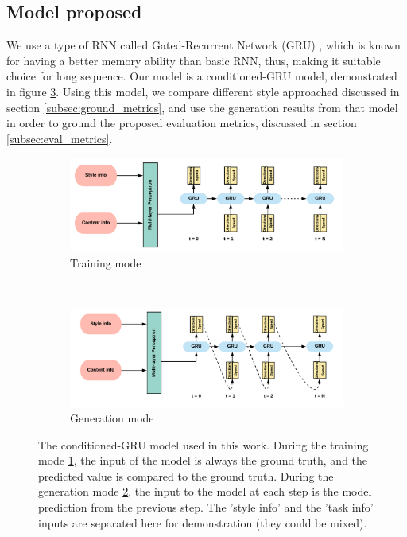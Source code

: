 \subsection{Model proposed}
We use a type of RNN called Gated-Recurrent Network (GRU) \citep{chung2014empirical}, which is known for having a better memory ability than basic RNN, thus, making it suitable choice for long sequence. Our model is a conditioned-GRU model, demonstrated in figure \ref{fig:dtl_model}. Using this model, we compare different style approached discussed in section \ref{subsec:ground_metrics}, and use the generation results from that model in order to ground the proposed evaluation metrics, discussed in section \ref{subsec:eval_metrics}.
\begin{figure}[!htbp]
    \centering
    \begin{subfigure}[b]{\textwidth}
        \includegraphics[width=\textwidth]{images/gbem/dtl_training.png}
        \caption{Training mode}
        \label{subfig:dtl_training}
    \end{subfigure}
    ~
    \begin{subfigure}[b]{\textwidth}
        \includegraphics[width=\textwidth]{images/gbem/dtl_generation.png}
        \caption{Generation mode}
        \label{subfig:dtl_generation}
    \end{subfigure}

    \caption{The conditioned-GRU model used in this work. During the training mode \ref{subfig:dtl_training}, the input of the model is always the ground truth, and the predicted value is compared to the ground truth. During the generation mode \ref{subfig:dtl_generation}, the input to the model at each step is the model prediction from the previous step. The 'style info' and the 'task info' inputs are separated here for demonstration (they could be mixed).}
    \label{fig:dtl_model}
\end{figure}

